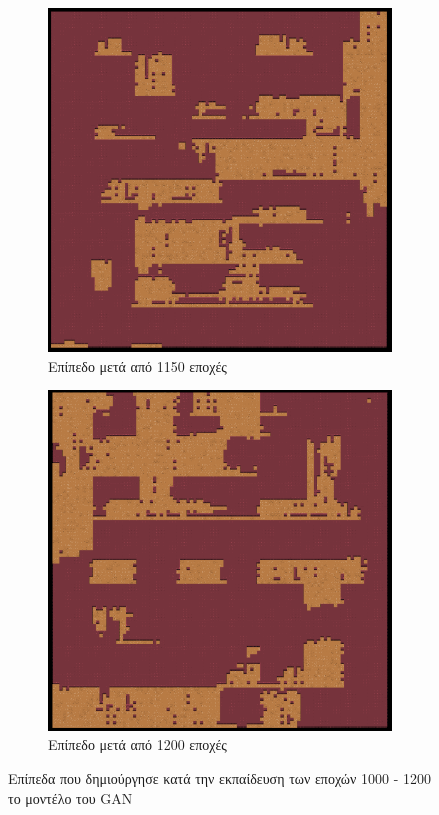 \begin{figure}[H]
\begin{subfigure}{.5\textwidth}
  \centering
  \includegraphics[width=.8\linewidth]{../images/generated/1150.png}
  \caption{Επίπεδο μετά από 1150 εποχές}
  \label{fig:sfig2}
\end{subfigure}
\begin{subfigure}{.5\textwidth}
  \centering
  \includegraphics[width=.8\linewidth]{../images/generated/1200.png}
  \caption{Επίπεδο μετά από 1200 εποχές}
  \label{fig:sfig2}
\end{subfigure}
\caption{Επίπεδα που δημιούργησε κατά την εκπαίδευση των εποχών 1000 - 1200 το μοντέλο του GAN}
\label{fig:fig}
\end{figure}

